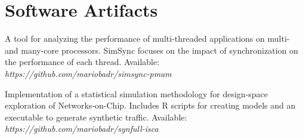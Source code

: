 \section{\sc Software Artifacts}

{
  A tool for analyzing the performance of multi-threaded applications on multi- and many-core processors.
  SimSync focuses on the impact of synchronization on the performance of each thread.
  Available: \textit{https://github.com/mariobadr/simsync-pmam}
}

{
  Implementation of a statistical simulation methodology for design-space exploration of Networks-on-Chip.
  Includes R scripts for creating models and an executable to generate synthetic traffic.
  Available: \textit{https://github.com/mariobadr/synfull-isca}
}
